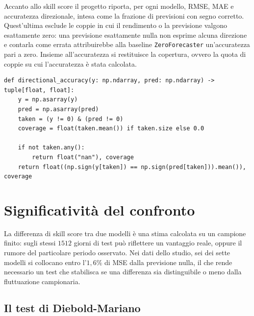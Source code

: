 Accanto allo skill score il progetto riporta, per ogni modello, RMSE, MAE e accuratezza direzionale, intesa come la frazione di previsioni con segno corretto. Quest'ultima esclude le coppie in cui il rendimento o la previsione valgono esattamente zero: una previsione esattamente nulla non esprime alcuna direzione e contarla come errata attribuirebbe alla baseline \texttt{ZeroForecaster} un'accuratezza pari a zero. Insieme all'accuratezza si restituisce la copertura, ovvero la quota di coppie su cui l'accuratezza è stata calcolata.

\begin{listing}[H]
\begin{verbatim}
def directional_accuracy(y: np.ndarray, pred: np.ndarray) -> tuple[float, float]:
    y = np.asarray(y)
    pred = np.asarray(pred)
    taken = (y != 0) & (pred != 0)
    coverage = float(taken.mean()) if taken.size else 0.0

    if not taken.any():
        return float("nan"), coverage
    return float((np.sign(y[taken]) == np.sign(pred[taken])).mean()), coverage
\end{verbatim}
\caption{\texttt{directional\_accuracy}}
\label{lst:directional-accuracy}
\end{listing}

\section{Significatività del confronto}
\label{sec:tc-significance}

La differenza di skill score tra due modelli è una stima calcolata su un campione finito: sugli stessi $1512$ giorni di test può riflettere un vantaggio reale, oppure il rumore del particolare periodo osservato. Nei dati dello studio, sei dei sette modelli si collocano entro l'$1{,}6\%$ di MSE dalla previsione nulla, il che rende necessario un test che stabilisca se una differenza sia distinguibile o meno dalla fluttuazione campionaria.

\subsection{Il test di Diebold-Mariano}


